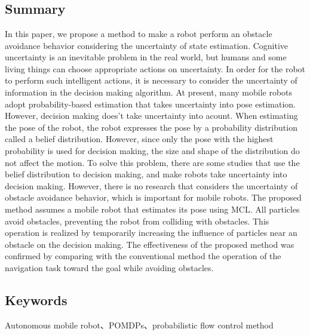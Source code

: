 \chapter*{}

\section*{Summary}
In this paper, we propose a method to make a robot perform an obstacle avoidance behavior considering the uncertainty of state estimation.
Cognitive uncertainty is an inevitable problem in the real world, but humans and some living things can choose appropriate actions on uncertainty.
In order for the robot to perform such intelligent actions, it is necessary to consider the uncertainty of information in the decision making algorithm.
At present, many mobile robots adopt probability-based estimation that takes uncertainty into pose estimation.
However, decision making does’t take uncertainty into acount.
When estimating the pose of the robot, the robot expresses the pose by a probability distribution called a belief distribution.
However, since only the pose with the highest probability is used for decision making, the size and shape of the distribution do not affect the motion.
To solve this problem, there are some studies that use the belief distribution to decision making, and make robots take uncertainty into decision making.
However, there is no research that considers the uncertainty of obstacle avoidance behavior, which is important for mobile robots.
The proposed method assumes a mobile robot that estimates its pose using MCL.
All particles avoid obstacles, preventing the robot from colliding with obstacles.
This operation is realized by temporarily increasing the influence of particles near an obstacle on the decision making.
The effectiveness of the proposed method was confirmed by comparing with the conventional method the operation of the navigation task toward the goal while avoiding obstacles.

\section*{Keywords}
Autonomous mobile robot、POMDPs、probabilistic flow control method
